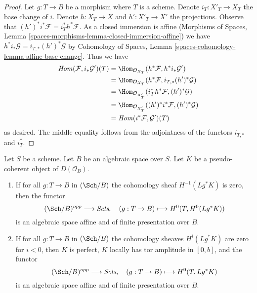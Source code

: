 \begin{proof}
Let $g : T \to B$ be a morphism where $T$ is a scheme.
Denote $i_T : X'_T \to X_T$ the base change of $i$.
Denote $h : X_T \to X$ and $h' : X'_T \to X'$ the projections.
Observe that $(h')^*i^*\mathcal{F} = i_T^*h^*\mathcal{F}$.
As a closed immersion is affine
(Morphisms of Spaces, Lemma
\ref{spaces-morphisms-lemma-closed-immersion-affine})
we have $h^*i_*\mathcal{G} = i_{T, *}(h')^*\mathcal{G}$ by
Cohomology of Spaces, Lemma \ref{spaces-cohomology-lemma-affine-base-change}.
Thus we have
\begin{align*}
\mathit{Hom}(\mathcal{F}, i_*\mathcal{G}')(T)
& =
\Hom_{\mathcal{O}_{X_T}}(h^*\mathcal{F}, h^*i_*\mathcal{G}') \\
& =
\Hom_{\mathcal{O}_{X_T}}(h^*\mathcal{F}, i_{T, *}(h')^*\mathcal{G}) \\
& =
\Hom_{\mathcal{O}_{X'_T}}(i_T^*h^*\mathcal{F}, (h')^*\mathcal{G}) \\
& =
\Hom_{\mathcal{O}_{X'_T}}((h')^*i^*\mathcal{F}, (h')^*\mathcal{G}) \\
& =
\mathit{Hom}(i^*\mathcal{F}, \mathcal{G}')(T)
\end{align*}
as desired. The middle equality follows from the adjointness of the functors
$i_{T, *}$ and $i_T^*$.
\end{proof}

\begin{lemma}
\label{lemma-cohomology-perfect-complex}
Let $S$ be a scheme. Let $B$ be an algebraic space over $S$.
Let $K$ be a pseudo-coherent object of $D(\mathcal{O}_B)$.
\begin{enumerate}
\item If for all $g : T \to B$ in $(\Sch/B)$ the cohomology sheaf
$H^{-1}(Lg^*K)$ is zero, then the functor
$$
(\Sch/B)^{opp} \longrightarrow \textit{Sets},\quad
(g : T \to B) \longmapsto H^0(T, H^0(Lg^*K))
$$
is an algebraic space affine and of finite presentation over $B$.
\item If for all $g : T \to B$ in $(\Sch/B)$ the cohomology sheaves
$H^i(Lg^*K)$ are zero for $i < 0$, then $K$ is perfect,
$K$ locally has tor amplitude in $[0, b]$, and the functor
$$
(\Sch/B)^{opp} \longrightarrow \textit{Sets},\quad
(g : T \to B) \longmapsto H^0(T, Lg^*K)
$$
is an algebraic space affine and of finite presentation over $B$.
\end{enumerate}
\end{lemma}

